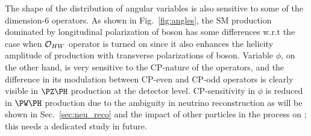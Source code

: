 \documentclass[a4paper,11pt]{article}
\begin{document}
The shape of the distribution of angular variables is also sensitive to some of the dimension-6 operators. As shown in Fig.~\ref{fig:angles}, 
the SM production dominated by longitudinal polarization of \PW boson has some differences w.r.t the case when ${\cal O}_{HW}$  operator is turned on since it also enhances the helicity amplitude of \PW\PH production with transverse polarizations of \PW boson. 
Variable $\phi$, on the other hand, is very sensitive to the CP-nature of the operators, and the difference in its modulation between CP-even and CP-odd operators is clearly visible in $\PZ\PH$ production at the detector level. 
CP-sensitivity in $\phi$ is reduced in $\PW\PH$ production due to the ambiguity in neutrino reconstruction as will be shown in Sec.~\ref{sec:neu_reco} and the impact of other particles in the process on \ptmiss; this needs a dedicated study in future.
\end{document}

